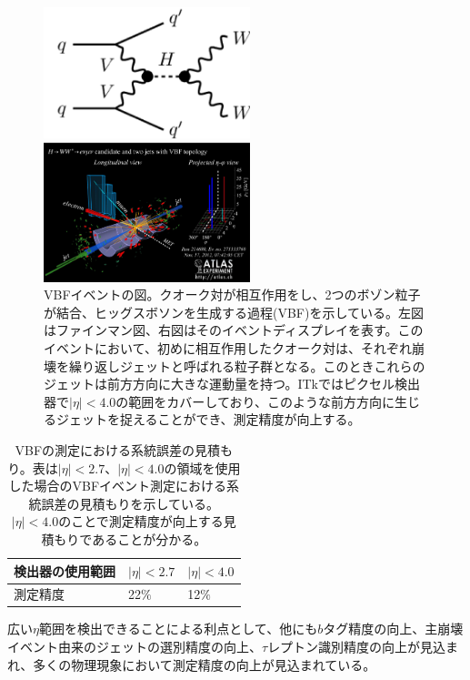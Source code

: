 \begin{figure}[bpt]
  \begin{minipage}{0.5\hsize}
    \begin{center}
    \includegraphics[width=60mm]{VBF_fainman}
    \end{center}
  \end{minipage}
  \begin{minipage}{0.5\hsize}
    \begin{center}
    \includegraphics[width=60mm]{VBF_event_display}
    \end{center}
  \end{minipage}
  \caption[VBFイベントの図]{VBFイベントの図。クオーク対が相互作用をし、2つのボゾン粒子が結合、ヒッグスボソンを生成する過程(VBF)を示している。左図はファインマン図、右図はそのイベントディスプレイを表す。このイベントにおいて、初めに相互作用したクオーク対は、それぞれ崩壊を繰り返しジェットと呼ばれる粒子群となる。このときこれらのジェットは前方方向に大きな運動量を持つ。ITkではピクセル検出器で$|\eta|<4.0$の範囲をカバーしており、このような前方方向に生じるジェットを捉えることができ、測定精度が向上する。}
  \label{VBF_image}
\end{figure}

\begin{table}[tbp]
\begin{center}
\caption[VBFの測定における系統誤差の見積もり]{VBFの測定における系統誤差の見積もり。表は$|\eta| <2.7$、$|\eta| <4.0$の領域を使用した場合のVBFイベント測定における系統誤差の見積もりを示している。$|\eta| <4.0$のことで測定精度が向上する見積もりであることが分かる。}
\label{VBF_uncertainty}
  \begin{tabular}{|lll|} \hline
    検出器の使用範囲 & $|\eta| <2.7 $ & $|\eta| < 4.0 $ \\ \hline
    測定精度 & 22$\%$ & 12$\%$ \\ \hline
  \end{tabular}
\end{center}
\end{table}

広い$\eta$範囲を検出できることによる利点として、他にも$b$タグ精度の向上、主崩壊イベント由来のジェットの選別精度の向上、$\tau$レプトン識別精度の向上が見込まれ、多くの物理現象において測定精度の向上が見込まれている。
